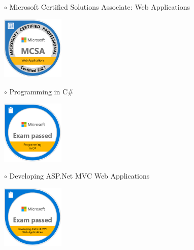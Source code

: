 \documentclass[10pt,a4paper,ragged2e,withhyper]{altacv}
\begin{document}
\begin{adjustbox}{valign=t}
\begin{minipage}{0.3\textwidth}
            \textcolor{ColorOne}{$\circ$} Microsoft Certified Solutions \newline Associate: Web Applications\\
            \begin{center}
            {\includegraphics[width=3cm]{Assets/Cert Badges/Microsoft_MCSA-Web_Applications.png}}\\
            \end{center}
            \textcolor{ColorOne}{$\circ$} Programming in C\#\\
            \begin{center}
            {\includegraphics[width=3cm]{Assets/Cert Badges/Microsoft_Programming_in_C.png}}\\
            \end{center}
            \textcolor{ColorOne}{$\circ$} Developing ASP.Net MVC Web Applications\\ 
            \begin{center}
            {\includegraphics[width=3cm]{Assets/Cert Badges/Microsoft_Developing_ASP.NET_MVC.png}}\\
            \end{center}
            
            \vfill
        
        
         
    \end{minipage}  
    \end{adjustbox} 
\end{document}
